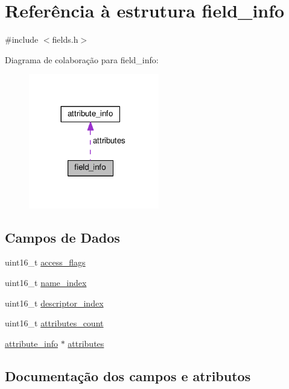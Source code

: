 \hypertarget{structfield__info}{}\section{Referência à estrutura field\+\_\+info}
\label{structfield__info}


{\ttfamily \#include $<$fields.\+h$>$}



Diagrama de colaboração para field\+\_\+info\+:\nopagebreak
\begin{figure}[H]
\begin{center}
\leavevmode
\includegraphics[width=161pt]{structfield__info__coll__graph}
\end{center}
\end{figure}
\subsection*{Campos de Dados}
\begin{DoxyCompactItemize}
\item 
uint16\+\_\+t \hyperlink{structfield__info_a97bcc8f6647cee71ea02bdd4183ba1da}{access\+\_\+flags}
\item 
uint16\+\_\+t \hyperlink{structfield__info_a3041f6a85347269c5253f7d377384b06}{name\+\_\+index}
\item 
uint16\+\_\+t \hyperlink{structfield__info_a56345eae0135047540b60ca34c91eb46}{descriptor\+\_\+index}
\item 
uint16\+\_\+t \hyperlink{structfield__info_a26aebef0abc97afef9e9a34701e6b550}{attributes\+\_\+count}
\item 
\hyperlink{structattribute__info}{attribute\+\_\+info} $\ast$ \hyperlink{structfield__info_afdda114944ae5eaae78c237f99257108}{attributes}
\end{DoxyCompactItemize}


\subsection{Documentação dos campos e atributos}
